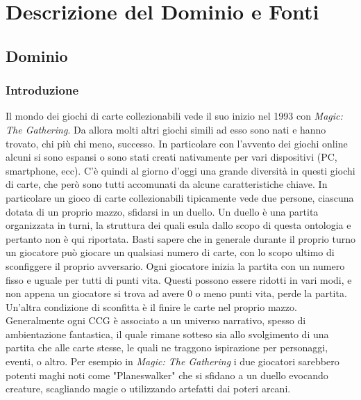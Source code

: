 \documentclass[12pt]{article}
\begin{document}
\newpage
\section{Descrizione del Dominio e Fonti}
\subsection{Dominio}
\subsubsection{Introduzione}
Il mondo dei giochi di carte collezionabili vede il suo inizio nel 1993 con \textit{Magic: The Gathering}. Da allora molti altri giochi simili ad esso sono nati e hanno trovato, chi più chi meno, successo. In particolare con l’avvento dei giochi online alcuni si sono espansi o sono stati creati nativamente per vari dispositivi (PC, smartphone, ecc). C’è quindi al giorno d’oggi una grande diversità in questi giochi di carte, che però sono tutti accomunati da alcune caratteristiche chiave. \newline
In particolare un gioco di carte collezionabili tipicamente vede due persone, ciascuna dotata di un proprio mazzo, sfidarsi in un duello. Un duello è una partita organizzata in turni, la struttura dei quali esula dallo scopo di questa ontologia e pertanto non è qui riportata. Basti sapere che in generale durante il proprio turno un giocatore può giocare un qualsiasi numero di carte, con lo scopo ultimo di sconfiggere il proprio avversario.
Ogni giocatore inizia la partita con un numero fisso e uguale per tutti di punti vita. Questi possono essere ridotti in vari modi, e non appena un giocatore si trova ad avere 0 o meno punti vita, perde la partita. Un'altra condizione di sconfitta è il finire le carte nel proprio mazzo. \newline
Generalmente ogni CCG è associato a un universo narrativo, spesso di ambientazione fantastica, il quale rimane sotteso sia allo svolgimento di una partita che alle carte stesse, le quali ne traggono ispirazione per personaggi, eventi, o altro. Per esempio in \textit{Magic: The Gathering} i due giocatori sarebbero potenti maghi noti come "Planeswalker" che si sfidano a un duello evocando creature, scagliando magie o utilizzando artefatti dai poteri arcani.
\end{document}
